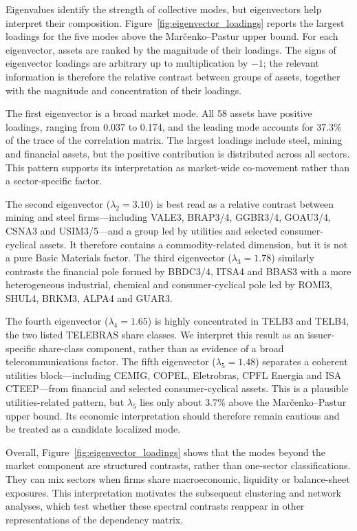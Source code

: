 Eigenvalues identify the strength of collective modes, but eigenvectors help interpret their composition. Figure~\ref{fig:eigenvector_loadings} reports the largest loadings for the five modes above the Mar\v{c}enko--Pastur upper bound. For each eigenvector, assets are ranked by the magnitude of their loadings. The signs of eigenvector loadings are arbitrary up to multiplication by $-1$; the relevant information is therefore the relative contrast between groups of assets, together with the magnitude and concentration of their loadings.

The first eigenvector is a broad market mode. All 58 assets have positive loadings, ranging from 0.037 to 0.174, and the leading mode accounts for 37.3\% of the trace of the correlation matrix. The largest loadings include steel, mining and financial assets, but the positive contribution is distributed across all sectors. This pattern supports its interpretation as market-wide co-movement rather than a sector-specific factor.

The second eigenvector ($\lambda_2=3.10$) is best read as a relative contrast between mining and steel firms---including VALE3, BRAP3/4, GGBR3/4, GOAU3/4, CSNA3 and USIM3/5---and a group led by utilities and selected consumer-cyclical assets. It therefore contains a commodity-related dimension, but it is not a pure Basic Materials factor. The third eigenvector ($\lambda_3=1.78$) similarly contrasts the financial pole formed by BBDC3/4, ITSA4 and BBAS3 with a more heterogeneous industrial, chemical and consumer-cyclical pole led by ROMI3, SHUL4, BRKM3, ALPA4 and GUAR3.

The fourth eigenvector ($\lambda_4=1.65$) is highly concentrated in TELB3 and TELB4, the two listed TELEBRAS share classes. We interpret this result as an issuer-specific share-class component, rather than as evidence of a broad telecommunications factor. The fifth eigenvector ($\lambda_5=1.48$) separates a coherent utilities block---including CEMIG, COPEL, Eletrobras, CPFL Energia and ISA CTEEP---from financial and selected consumer-cyclical assets. This is a plausible utilities-related pattern, but $\lambda_5$ lies only about 3.7\% above the Mar\v{c}enko--Pastur upper bound. Its economic interpretation should therefore remain cautious and be treated as a candidate localized mode.

Overall, Figure~\ref{fig:eigenvector_loadings} shows that the modes beyond the market component are structured contrasts, rather than one-sector classifications. They can mix sectors when firms share macroeconomic, liquidity or balance-sheet exposures. This interpretation motivates the subsequent clustering and network analyses, which test whether these spectral contrasts reappear in other representations of the dependency matrix.

